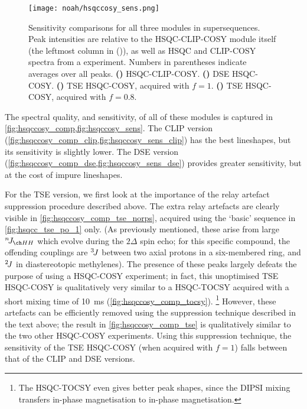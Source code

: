 \begin{figure}[!ht]
    \centering
    \texttt{[image: noah/hsqccosy\_sens.png]}%
    {\label{fig:hsqccosy_sens_clip}}%
    {\label{fig:hsqccosy_sens_dse}}%
    {\label{fig:hsqccosy_sens_tse_1}}%
    {\label{fig:hsqccosy_sens_tse_0p8}}%
    \caption[Sensitivity comparisons for  supersequences]{
        Sensitivity comparisons for all three modules in  supersequences.
        Peak intensities are relative to the HSQC-CLIP-COSY module itself (the leftmost column in ()), as well as HSQC and CLIP-COSY spectra from a  experiment.
        Numbers in parentheses indicate averages over all peaks.
        \textbf{()} HSQC-CLIP-COSY.
        \textbf{()} DSE HSQC-COSY.
        \textbf{()} TSE HSQC-COSY, acquired with $f = 1$.
        \textbf{()} TSE HSQC-COSY, acquired with $f = 0.8$.
    }
    \label{fig:hsqccosy_sens}
\end{figure}

The spectral quality, and sensitivity, of all of these modules is captured in \cref{fig:hsqccosy_comp,fig:hsqccosy_sens}.
The CLIP version (\cref{fig:hsqccosy_comp_clip,fig:hsqccosy_sens_clip}) has the best lineshapes, but its sensitivity is slightly lower.
The DSE version (\cref{fig:hsqccosy_comp_dse,fig:hsqccosy_sens_dse}) provides greater sensitivity, but at the cost of impure lineshapes.

For the TSE version, we first look at the importance of the relay artefact suppression procedure described above.
The extra relay artefacts are clearly visible in \cref{fig:hsqccosy_comp_tse_norps}, acquired using the `basic' sequence in \cref{fig:hsqcc_tse_po_1} only.
(As previously mentioned, these arise from large $\nJ{HH}$ which evolve during the $2\Delta$ spin echo; for this specific compound, the offending couplings are $^3\!J\/$ between two axial protons in a six-membered ring, and $^2\!J\/$ in diastereotopic methylenes).
The presence of these peaks largely defeats the purpose of using a HSQC-COSY experiment; in fact, this unoptimised TSE HSQC-COSY is qualitatively very similar to a HSQC-TOCSY acquired with a short mixing time of \qty{10}{\ms} (\cref{fig:hsqccosy_comp_tocsy}).%
\footnote{The HSQC-TOCSY even gives better peak shapes, since the DIPSI mixing transfers in-phase magnetisation to in-phase magnetisation.}
However, these artefacts can be efficiently removed using the suppression technique described in the text above; the result in \cref{fig:hsqccosy_comp_tse} is qualitatively similar to the two other HSQC-COSY experiments.
Using this suppression technique, the sensitivity of the TSE HSQC-COSY (when acquired with $f = 1$) falls between that of the CLIP and DSE versions.

